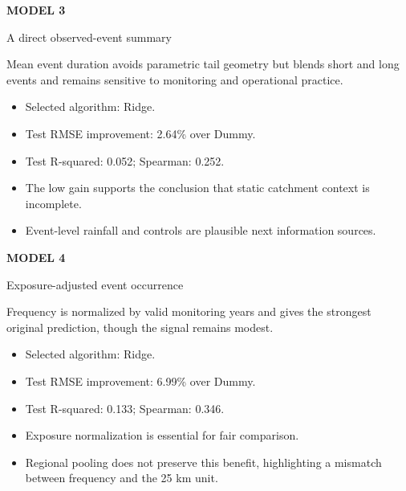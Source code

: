 \documentclass[10pt]{article}
\begin{document}
\vfill{}
\clearpage
{\color{teal}\small\bfseries MODEL 3}\par
{}\par
\small A direct observed-event summary\par\vspace{5mm}
Mean event duration avoids parametric tail geometry but blends short and long events and remains sensitive to monitoring and operational practice.
\begin{itemize}[leftmargin=5mm]
\item Selected algorithm: Ridge.
\item Test RMSE improvement: 2.64\% over Dummy.
\item Test R-squared: 0.052; Spearman: 0.252.
\item The low gain supports the conclusion that static catchment context is incomplete.
\item Event-level rainfall and controls are plausible next information sources.
\end{itemize}
\vfill{}
\clearpage
{\color{teal}\small\bfseries MODEL 4}\par
{}\par
\small Exposure-adjusted event occurrence\par\vspace{5mm}
Frequency is normalized by valid monitoring years and gives the strongest original prediction, though the signal remains modest.
\begin{itemize}[leftmargin=5mm]
\item Selected algorithm: Ridge.
\item Test RMSE improvement: 6.99\% over Dummy.
\item Test R-squared: 0.133; Spearman: 0.346.
\item Exposure normalization is essential for fair comparison.
\item Regional pooling does not preserve this benefit, highlighting a mismatch between frequency and the 25 km unit.
\end{itemize}
\vfill{}
\end{document}
